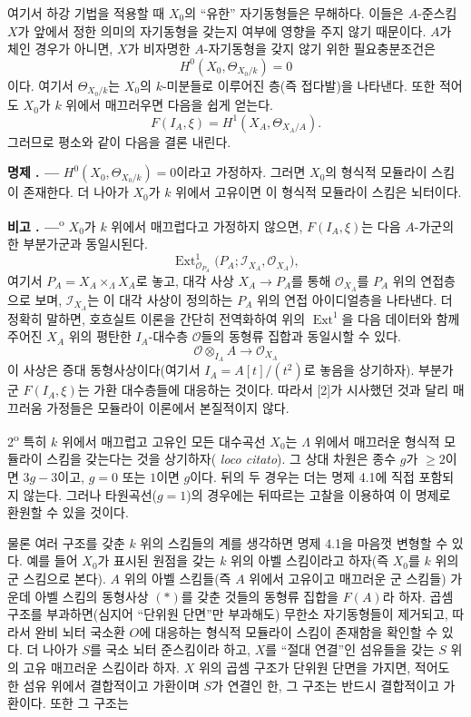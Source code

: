 \documentclass[11pt,twoside,openany]{book}
\numberwithin{equation}{section}
\newcommand{\sourceunit}{front}
\newcommand{\src}[1]{%
  \phantomsection\hypertarget{src:\sourceunit:#1}{}%
  \marginpar{\raggedleft\footnotesize\sffamily #1}%
}
\theoremstyle{plain}
\theoremstyle{definition}
\theoremstyle{remark}
\newcommand{\result}[2]{%
  \par\medskip\noindent\textbf{#1%
  \if\relax\detokenize{#2}\relax\else\space#2\fi. ---}\enspace
}
\begin{document}
여기서 하강 기법을 적용할 때 $X_0$의 ``유한'' 자기동형들은 무해하다.
이들은 $A$-준스킴 $X$가 앞에서 정한 의미의 자기동형을 갖는지 여부에
영향을 주지 않기 때문이다. $A$가 체인 경우가 아니면, $X$가 비자명한
$A$-자기동형을 갖지 않기 위한 필요충분조건은
\[
  H^0(X_0,\Theta_{X_0/k})=0
\]
이다. 여기서 $\Theta_{X_0/k}$는 $X_0$의 $k$-미분들로 이루어진 층(즉
접다발)을 나타낸다. 또한 적어도 $X_0$가 $k$ 위에서 매끄러우면 다음을
쉽게 얻는다.
\[
  F(I_A,\xi)=H^1(X_A,\Theta_{X_A/A}).
\]
그러므로 평소와 같이 다음을 결론 내린다.

\src{386}
\result{명제}{4.1} $H^0(X_0,\Theta_{X_0/k})=0$이라고 가정하자. 그러면
$X_0$의 형식적 모듈라이 스킴이 존재한다. 더 나아가 $X_0$가 $k$ 위에서
고유이면 이 형식적 모듈라이 스킴은 뇌터이다.

\result{비고}{} 1\textsuperscript{o} $X_0$가 $k$ 위에서 매끄럽다고
가정하지 않으면, $F(I_A,\xi)$는 다음 $A$-가군의 한 부분가군과 동일시된다.
\[
  \operatorname{Ext}^1_{\mathcal O_{P_A}}
  \bigl(P_A;\mathcal I_{X_A},\mathcal O_{X_A}\bigr),
\]
여기서 $P_A=X_A\times_\Lambda X_A$로 놓고, 대각 사상
$X_A\longrightarrow P_A$를 통해 $\mathcal O_{X_A}$를 $P_A$ 위의
연접층으로 보며, $\mathcal I_{X_A}$는 이 대각 사상이 정의하는 $P_A$
위의 연접 아이디얼층을 나타낸다. 더 정확히 말하면, 호흐실트 이론을
간단히 전역화하여 위의 $\operatorname{Ext}^1$을 다음 데이터와 함께 주어진
$X_A$ 위의 평탄한 $I_A$-대수층 $\mathcal O$들의 동형류 집합과 동일시할
수 있다.
\[
  \mathcal O\otimes_{I_A}A\longrightarrow\mathcal O_{X_A}
\]
이 사상은 증대 동형사상이다(여기서 $I_A=A[t]/(t^2)$로 놓음을 상기하자).
부분가군 $F(I_A,\xi)$는 가환 대수층들에 대응하는 것이다. 따라서 [2]가
시사했던 것과 달리 매끄러움 가정들은 모듈라이 이론에서 본질적이지 않다.

2\textsuperscript{o} 특히 $k$ 위에서 매끄럽고 고유인 모든 대수곡선
$X_0$는 $\Lambda$ 위에서 매끄러운 형식적 모듈라이 스킴을 갖는다는 것을
상기하자(
\textit{loco citato}). 그 상대 차원은 종수 $g$가 $\geq2$이면 $3g-3$이고,
$g=0$ 또는 $1$이면 $g$이다. 뒤의 두 경우는 더는 명제 4.1에 직접
포함되지 않는다. 그러나 타원곡선($g=1$)의 경우에는 뒤따르는 고찰을
이용하여 이 명제로 환원할 수 있을 것이다.

물론 여러 구조를 갖춘 $k$ 위의 스킴들의 계를 생각하면 명제 4.1을 마음껏
변형할 수 있다. 예를 들어 $X_0$가 표시된 원점을 갖는 $k$ 위의 아벨
스킴이라고 하자(즉 $X_0$를 $k$ 위의 군 스킴으로 본다). $A$ 위의 아벨
스킴들(즉 $A$ 위에서 고유이고 매끄러운 군 스킴들) 가운데 아벨 스킴의
동형사상 $(*)$를 갖춘 것들의 동형류 집합을 $F(A)$라 하자. 곱셈 구조를
부과하면(심지어 ``단위원 단면''만 부과해도) 무한소 자기동형들이 제거되고,
따라서 완비 뇌터 국소환 $O$에 대응하는 형식적 모듈라이 스킴이 존재함을
확인할 수 있다. 더 나아가 $S$를 국소 뇌터 준스킴이라 하고, $X$를
``절대 연결''인 섬유들을 갖는 $S$ 위의 고유 매끄러운 스킴이라 하자.
$X$ 위의 곱셈 구조가 단위원 단면을 가지면, 적어도 한 섬유 위에서 결합적이고
가환이며 $S$가 연결인 한, 그 구조는 반드시 결합적이고 가환이다. 또한 그
구조는
\end{document}
